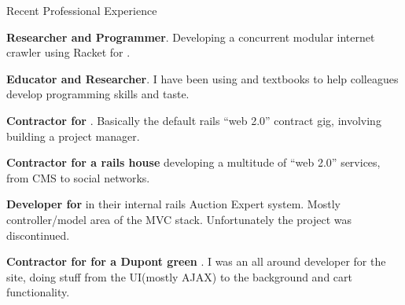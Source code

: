 \begin{rubric}{Recent Professional Experience}{

  \entry*[2010 - Present]
  \textbf{Researcher and Programmer}. Developing a concurrent modular
  internet crawler using Racket for .

  \entry*[2009]
  \textbf{Educator and Researcher}. I have been using 
   and
  textbooks to help colleagues develop programming skills and taste.

  \entry*[2009] 
  \textbf{Contractor for
    }. Basically the
  default rails ``web 2.0'' contract gig, involving building a project
  manager.

  \entry*[2007 - 2008] 
  \textbf{Contractor for  a rails house} 
  developing a multitude of ``web 2.0'' services, from CMS to social networks.

  \entry*[2007] 
  \textbf{Developer for } 
  in their internal rails Auction Expert system. Mostly controller/model area of
  the MVC stack. Unfortunately the project was discontinued.

  \entry*[2007] 
  \textbf{Contractor for  
    for a Dupont green }.
  I was an all around developer for the site, doing stuff from the
  UI(mostly AJAX) to the background and cart functionality.


}\end{rubric}

